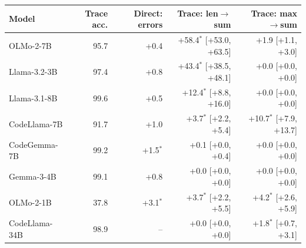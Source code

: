 \begin{tabular}{@{}lrrrr@{}}
\toprule
Model & Trace acc. & Direct: errors & Trace: len$\to$sum & Trace: max$\to$sum \\
\midrule
OLMo-2-7B & 95.7 & +0.4 & +58.4$^{*}$ [+53.0, +63.5] & +1.9 [+1.1, +3.0] \\
Llama-3.2-3B & 97.4 & +0.8 & +43.4$^{*}$ [+38.5, +48.1] & +0.0 [+0.0, +0.0] \\
Llama-3.1-8B & 99.6 & +0.5 & +12.4$^{*}$ [+8.8, +16.0] & +0.0 [+0.0, +0.0] \\
CodeLlama-7B & 91.7 & +1.0 & +3.7$^{*}$ [+2.2, +5.4] & +10.7$^{*}$ [+7.9, +13.7] \\
CodeGemma-7B & 99.2 & +1.5$^{*}$ & +0.1 [+0.0, +0.4] & +0.0 [+0.0, +0.0] \\
Gemma-3-4B & 99.1 & +0.8 & +0.0 [+0.0, +0.0] & +0.0 [+0.0, +0.0] \\
OLMo-2-1B & 37.8 & +3.1$^{*}$ & +3.7$^{*}$ [+2.2, +5.5] & +4.2$^{*}$ [+2.6, +5.9] \\
CodeLlama-34B & 98.9 & -- & +0.0 [+0.0, +0.0] & +1.8$^{*}$ [+0.7, +3.1] \\
\bottomrule
\end{tabular}
